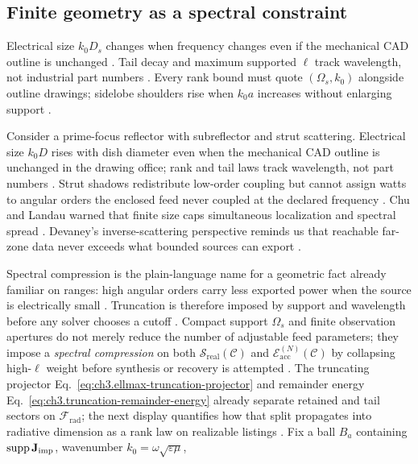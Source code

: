 \subsection{Finite geometry as a spectral constraint}
\label{sec:ch402}
Electrical size $k_0 D_s$ changes when frequency changes even if the mechanical CAD outline is unchanged \cite{jackson1999}. Tail decay and maximum supported $\ell$ track wavelength, not industrial part numbers \cite{hansen1988}. Every rank bound must quote $(\Omega_s,k_0)$ alongside outline drawings; sidelobe shoulders rise when $k_0a$ increases without enlarging support \cite{stratton1941}.
\begin{physicalvignette}
Consider a prime-focus reflector with subreflector and strut scattering. Electrical size $k_0 D$ rises with dish diameter even when the mechanical CAD outline is unchanged in the drawing office; rank and tail laws track wavelength, not part numbers \cite{jackson1999}. Strut shadows redistribute low-order coupling but cannot assign watts to angular orders the enclosed feed never coupled at the declared frequency \cite{stratton1941}.
Chu and Landau warned that finite size caps simultaneous localization and spectral spread \cite{chu1948}. Devaney's inverse-scattering perspective reminds us that reachable far-zone data never exceeds what bounded sources can export \cite{devaney2004}.
\end{physicalvignette}
Spectral compression is the plain-language name for a geometric fact already familiar on ranges: high angular orders carry less exported power when the source is electrically small \cite{jackson1999}. Truncation is therefore imposed by support and wavelength before any solver chooses a cutoff \cite{devaney2004}. Compact support \(\Omega_{s}\) and finite observation apertures do not merely reduce the number of
adjustable feed parameters; they impose a \emph{spectral compression} on both
\(\mathcal{S}_{\mathrm{real}}(\mathcal{C})\) and \(\mathcal{E}_{\mathrm{acc}}^{(N)}(\mathcal{C})\)
by collapsing high-\(\ell\) weight before synthesis or recovery is attempted
\cite{stratton1941}. The truncating projector
Eq.~\eqref{eq:ch3.ellmax-truncation-projector} and remainder energy
Eq.~\eqref{eq:ch3.truncation-remainder-energy} already separate retained and tail sectors on
\(\mathcal{F}_{\mathrm{rad}}\); the next display quantifies how that split propagates into
radiative dimension as a rank law on realizable listings \cite{hansen1988}.
Fix a ball \(B_{a}\) containing \(\operatorname{supp}\mathbf{J}_{\mathrm{imp}}\), wavenumber \(k_{0}=\omega\sqrt{\varepsilon\mu}\),
